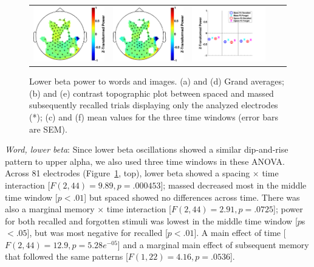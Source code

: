 \begin{figure}[H]
\begin{tabular}{ccccc}
  \includegraphics[width=.19\textwidth]{./figs/exp1/tfr_topocont_ga_img_RgH_rc_spac_p2vsimg_RgH_rc_mass_p2_78ROIs_13_21_0_500_-1p0_1p0_cb} &
  \includegraphics[width=.19\textwidth]{./figs/exp1/tfr_topocont_ga_img_RgH_rc_spac_p2vsimg_RgH_rc_mass_p2_78ROIs_13_21_520_1000_-1p0_1p0_cb} &
  \includegraphics[width=.30\textwidth]{./figs/exp1/tfr_avg_ga_img_RgH_rc_mass_p2_img_RgH_fo_mass_p2_img_RgH_rc_spac_p2_img_RgH_fo_spac_p2_78ROI_0_333_333_666_666_1000_13_21_ylabel} \\
  \end{tabular}
  \caption{Lower beta power to words and images.  (a) and (d) Grand averages; (b) and (e) contrast topographic plot between spaced and massed subsequently recalled trials displaying only the analyzed electrodes (*); (c) and (f) mean values for the three time windows (error bars are SEM).}
  \label{fig:word_img_beta_low}
\end{figure}

\textit{Word, lower beta}:  Since lower beta oscillations showed a similar dip-and-rise pattern to upper alpha, we also used three time windows in these ANOVA.  Across 81 electrodes (Figure~\ref{fig:word_img_beta_low}, top), lower beta showed a spacing $\times$ time interaction [$F(2,44)=9.89, p=.000453$]; massed decreased most in the middle time window [$p<.01$] but spaced showed no differences across time.  There was also a marginal memory $\times$ time interaction [$F(2,44)=2.91, p=.0725$]; power for both recalled and forgotten stimuli was lowest in the middle time window [$p$s~$<.05$], but was most negative for recalled [$p<.01$].
A main effect of time [$F(2,44)=12.9, p=5.28e^{-05}$] and a marginal main effect of subsequent memory that followed the same patterns [$F(1,22)=4.16, p=.0536$].

